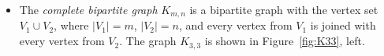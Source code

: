 

\setcounter{section}{1}
\setcounter{subsection}{2}
\setcounter{dfn}{2}


\begin{itemize}
\item
The \emph{complete bipartite graph} $K_{m,n}$ is a bipartite graph with the vertex set $V_1 \cup V_2$,
where $|V_1| = m$, $|V_2| = n$, and every vertex from $V_1$ is joined with every vertex from $V_2$.
The graph $K_{3,3}$ is shown in Figure~\ref{fig:K33}, left.
\end{itemize}




